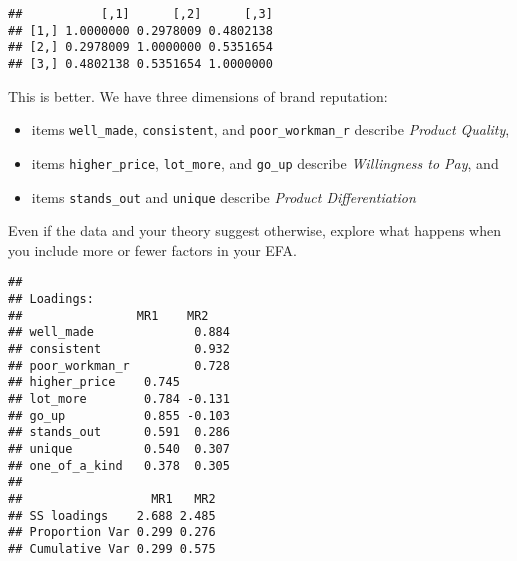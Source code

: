 \documentclass[
]{book}
\newenvironment{Shaded}{\begin{snugshade}}{\end{snugshade}}
\newcommand{\AttributeTok}[1]{\textcolor[rgb]{0.77,0.63,0.00}{#1}}
\newcommand{\DecValTok}[1]{\textcolor[rgb]{0.00,0.00,0.81}{#1}}
\newcommand{\FunctionTok}[1]{\textcolor[rgb]{0.00,0.00,0.00}{#1}}
\newcommand{\NormalTok}[1]{#1}
\newcommand{\SpecialCharTok}[1]{\textcolor[rgb]{0.00,0.00,0.00}{#1}}
\providecommand{\tightlist}{%
  \setlength{\itemsep}{0pt}\setlength{\parskip}{0pt}}
\theoremstyle{definition}
\theoremstyle{definition}
\theoremstyle{definition}
\theoremstyle{definition}
\theoremstyle{remark}
\begin{document}
\begin{verbatim}
##           [,1]      [,2]      [,3]
## [1,] 1.0000000 0.2978009 0.4802138
## [2,] 0.2978009 1.0000000 0.5351654
## [3,] 0.4802138 0.5351654 1.0000000
\end{verbatim}

This is better. We have three dimensions of brand reputation:

\begin{itemize}
\tightlist
\item
  items \texttt{well\_made}, \texttt{consistent}, and \texttt{poor\_workman\_r} describe \emph{Product Quality},
\item
  items \texttt{higher\_price}, \texttt{lot\_more}, and \texttt{go\_up} describe \emph{Willingness to Pay}, and
\item
  items \texttt{stands\_out} and \texttt{unique} describe \emph{Product Differentiation}
\end{itemize}

Even if the data and your theory suggest otherwise, explore what happens when you include more or fewer factors in your EFA.

\begin{Shaded}
\end{Shaded}

\begin{verbatim}
## 
## Loadings:
##                MR1    MR2   
## well_made              0.884
## consistent             0.932
## poor_workman_r         0.728
## higher_price    0.745       
## lot_more        0.784 -0.131
## go_up           0.855 -0.103
## stands_out      0.591  0.286
## unique          0.540  0.307
## one_of_a_kind   0.378  0.305
## 
##                  MR1   MR2
## SS loadings    2.688 2.485
## Proportion Var 0.299 0.276
## Cumulative Var 0.299 0.575
\end{verbatim}

\begin{Shaded}
\end{Shaded}
\end{document}
